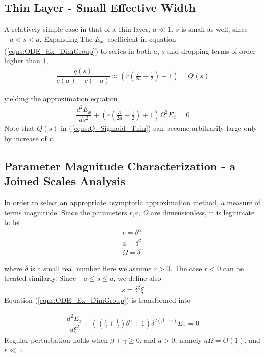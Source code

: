\documentclass[twocolumn,secnumarabic,amssymb, nobibnotes, aps, prd]{revtex4-1}
\begin{document}
\subsection{Thin Layer - Small Effective Width }
A relatively simple case in that of a thin layer, $a \ll 1$.
$s$ is small as well, since $-a<s<a$. Expanding The $E_{x_j}$ coefficient in equation (\ref{eqns:ODE_Ex_DimGroup}) to series in both $a$, $s$ and dropping terms of order higher than 1, 
\begin{align}
\label{eqns:Q_Sigmoid_Thin}
\dfrac{q(s)}{c(a)-c(-a)} \approx \left( r \left(\frac{s}{2 a}+\frac{1}{2}\right)+1 \right)=Q(s) 
\end{align}

yielding the approximation equation
\begin{align}
\label{eqns:ode_Sigmoid_Thin}
\dfrac{d^2 E_x}{ds^2}+\left( r \left(\frac{s}{2 a}+\frac{1}{2}\right)+1 \right) \Omega^2 E_x = 0
\end{align}
Note that $Q(s)$ in (\ref{eqns:Q_Sigmoid_Thin}) can become arbitrarily large only by increase of $r$. 

\subsection{Parameter Magnitude Characterization - a Joined Scales Analysis }


In order to select an appropriate asymptotic  approximation method, a measure of terms magnitude. Since the parameters $r$,$a$, $\Omega$ are dimensionless, it is legitimate to let 
\begin{subequations}
\begin{align}
r = \delta^\alpha \\
a = \delta^\beta \\
\Omega = \delta^\gamma
\end{align}
\end{subequations}

where $\delta$ is a small real number.Here we assume $r>0$. The case $r<0$ can be treated similarly.
Since $-a \leq s \leq a$, we define also
\begin{align}
s = \delta^\beta \xi
\end{align}
Equation (\ref{eqns:ODE_Ex_DimGroup}) is transformed into

\begin{align}
\dfrac{d^2 E_x}{d \xi^2}+ \left(\left(\frac{\xi }{2}+\frac{1}{2}\right) \delta ^{\alpha
   }+1\right) \delta ^{2 (\beta +\gamma )}E_x=0
\end{align}
Regular perturbation holds when $\beta+\gamma \geq 0$, and  $a>0$, namely $a \Omega =O(1)$, and $r \ll 1$.\\
\end{document}
